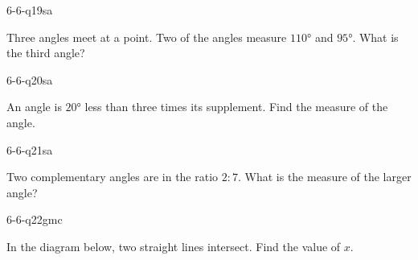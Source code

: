 \begin{practiceQuestion}{6-6-q19}{sa}
\begin{questionText}
Three angles meet at a point. Two of the angles measure $110°$ and $95°$. What is the third angle?
\end{questionText}
\end{practiceQuestion}

\begin{practiceQuestion}{6-6-q20}{sa}
\begin{questionText}
An angle is $20°$ less than three times its supplement. Find the measure of the angle.
\end{questionText}
\end{practiceQuestion}

\begin{practiceQuestion}{6-6-q21}{sa}
\begin{questionText}
Two complementary angles are in the ratio $2:7$. What is the measure of the larger angle?
\end{questionText}
\end{practiceQuestion}


\begin{practiceQuestion}{6-6-q22}{gmc}
\begin{questionText}
In the diagram below, two straight lines intersect. Find the value of $x$.

\begin{center}
\end{center}
\end{questionText}
\end{practiceQuestion}


